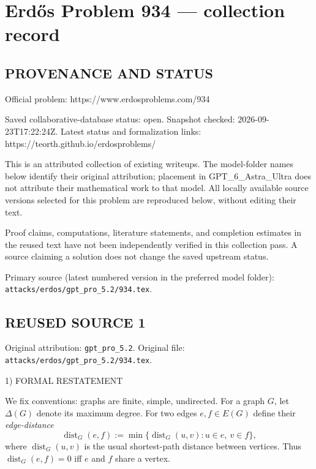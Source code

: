 \section*{Erd\H{o}s Problem 934 --- collection record}

\subsection*{PROVENANCE AND STATUS}
Official problem: https://www.erdosproblems.com/934

Saved collaborative-database status: open.
Snapshot checked: 2026-09-23T17:22:24Z.
Latest status and formalization links: https://teorth.github.io/erdosproblems/

This is an attributed collection of existing writeups. The model-folder names below identify their original attribution; placement in GPT\_6\_Astra\_Ultra does not attribute their mathematical work to that model. All locally available source versions selected for this problem are reproduced below, without editing their text.

Proof claims, computations, literature statements, and completion estimates in the reused text have not been independently verified in this collection pass. A source claiming a solution does not change the saved upstream status.

Primary source (latest numbered version in the preferred model folder): \texttt{attacks/erdos/gpt\_pro\_5.2/934.tex}.

\subsection*{REUSED SOURCE 1}
Original attribution: \texttt{gpt\_pro\_5.2}.
Original file: \texttt{attacks/erdos/gpt\_pro\_5.2/934.tex}.


1) FORMAL RESTATEMENT

We fix conventions: graphs are finite, simple, undirected.
For a graph $G$, let $\Delta(G)$ denote its maximum degree.
For two edges $e,f\in E(G)$ define their \emph{edge-distance}
\[
\operatorname{dist}_G(e,f):=\min\{\operatorname{dist}_G(u,v): u\in e,\ v\in f\},
\]
where $\operatorname{dist}_G(u,v)$ is the usual shortest-path distance between vertices.
Thus $\operatorname{dist}_G(e,f)=0$ iff $e$ and $f$ share a vertex.

